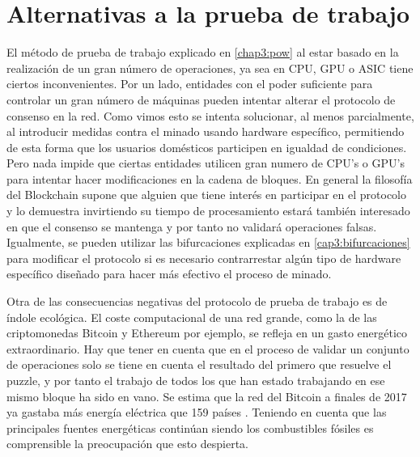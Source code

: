 
\section{Alternativas a la prueba de trabajo}
El método de prueba de trabajo explicado en \ref{chap3:pow} al estar basado en la realización de un gran número de operaciones, ya sea en CPU, GPU o ASIC tiene ciertos inconvenientes. Por un lado, entidades con el poder suficiente para controlar un gran número de máquinas pueden intentar alterar el protocolo de consenso en la red. Como vimos esto se intenta solucionar, al menos parcialmente, al introducir medidas contra el minado usando hardware específico, permitiendo de esta forma que los usuarios domésticos participen en igualdad de condiciones. Pero nada impide que ciertas entidades utilicen gran numero de CPU's o GPU's para intentar hacer modificaciones en la cadena de bloques.
En general la filosofía del Blockchain supone que alguien que tiene interés en participar en el protocolo y lo demuestra invirtiendo su tiempo de procesamiento estará también interesado en que el consenso se mantenga y por tanto no validará operaciones falsas. Igualmente, se pueden utilizar las bifurcaciones explicadas en \ref{cap3:bifurcaciones} para modificar el protocolo si es necesario contrarrestar algún tipo de hardware específico diseñado para hacer más efectivo el proceso de minado.

Otra de las consecuencias negativas del protocolo de prueba de trabajo es de índole ecológica. El coste computacional de una red grande, como la de las criptomonedas Bitcoin y Ethereum por ejemplo, se refleja en un gasto energético extraordinario. Hay que tener en cuenta que en el proceso de validar un conjunto de operaciones solo se tiene en cuenta el resultado del primero que resuelve el puzzle, y por tanto el trabajo de todos los que han estado trabajando en ese mismo bloque ha sido en vano. Se estima que la red del Bitcoin a finales de 2017 ya gastaba más energía eléctrica que 159 países \citep{electricidad}. Teniendo en cuenta que las principales fuentes energéticas continúan siendo los combustibles fósiles es comprensible la preocupación que esto despierta.

